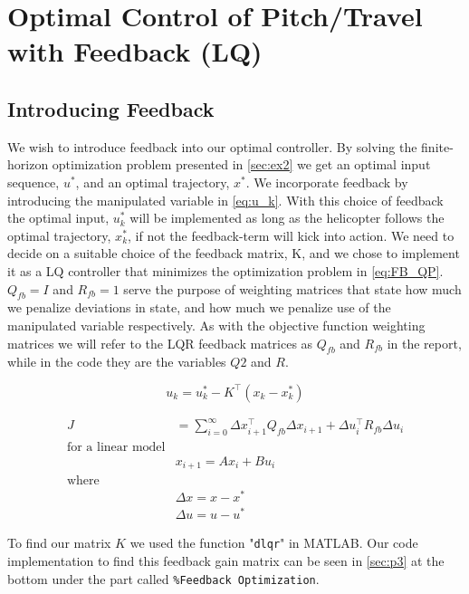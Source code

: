 \section{Optimal Control of Pitch/Travel with Feedback (LQ)}\label{sec:ex3}

\subsection{Introducing Feedback}
We wish to introduce feedback into our optimal controller. By solving the finite-horizon optimization problem presented in \cref{sec:ex2} we get an optimal input sequence, $u^*$, and an optimal trajectory, $x^*$. We incorporate feedback by introducing the manipulated variable in \cref{eq:u_k}. With this choice of feedback the optimal input, $u_k^*$ will be implemented as long as the helicopter follows the optimal trajectory, $x_k^*$, if not the feedback-term will kick into action. We need to decide on a suitable choice of the feedback matrix, K, and we chose to implement it as a LQ controller that minimizes the optimization problem in \cref{eq:FB_QP}. $Q_{fb} = I$ and $R_{fb} = 1$ serve the purpose of weighting matrices that state how much we penalize deviations in state, and how much we penalize use of the manipulated variable respectively. As with the objective function weighting matrices we will refer to the LQR feedback matrices as $Q_{fb}$ and $R_{fb}$ in the report, while in the code they are the variables $Q2$ and $R$.

\begin{equation}\label{eq:u_k}
    u_k = u_k^* - K^{\top}(x_k - x_k^*)
\end{equation}

\begin{subequations}\label{eq:FB_QP}
\begin{align}
    J &= \sum_{i=0}^\infty \Delta x_{i+1}^{\top}Q_{fb}\Delta x_{i+1} + \Delta u_i^{\top} R_{fb} \Delta u_i \\
    \text{for a linear model}\nonumber \\ 
    &x_{i+1} = Ax_i + Bu_i \\
    \text{where}\nonumber \\ 
    &\Delta x = x - x^* \\
    &\Delta u = u - u^*
\end{align}
\end{subequations}

To find our matrix $K$ we used the function "\texttt{dlqr}" in MATLAB. Our code implementation to find this feedback gain matrix can be seen in \cref{sec:p3} at the bottom under the part called \texttt{\%Feedback Optimization}.


